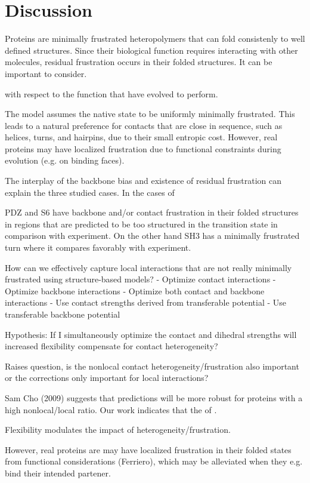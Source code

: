 \documentclass[preprint]{elsarticle}
\begin{document}
\section{Discussion}

    Proteins are minimally frustrated heteropolymers that can fold consistenly
to well defined structures. Since their biological function requires
interacting with other molecules, residual frustration occurs in their folded
structures. It can be important to consider.

 with respect to the function that have
evolved to perform.

    The model assumes the native state to be uniformly minimally frustrated.
This leads to a natural preference for contacts that are close in sequence,
such as helices, turns, and hairpins, due to their small entropic cost. 
However, real proteins may have localized frustration due to functional
constraints during evolution (e.g. on binding faces).  

    The interplay of the backbone bias and existence of residual frustration
can explain the three studied cases. In the cases of 

    PDZ and S6 have backbone and/or contact frustration in their folded
structures in regions that are predicted to be too structured in the transition
state in comparison with experiment. On the other hand SH3 has a minimally
frustrated turn where it compares favorably with experiment.

    How can we effectively capture local interactions that are not really
minimally frustrated using structure-based models?
    - Optimize contact interactions
    - Optimize backbone interactions
    - Optimize both contact and backbone interactions
    - Use contact strengths derived from transferable potential
    - Use transferable backbone potential

Hypothesis: If I simultaneously optimize the contact and dihedral strengths
will increased flexibility compensate for contact heterogeneity?

    Raises question, is the nonlocal contact heterogeneity/frustration also
important or the corrections only important for local interactions? 

    Sam Cho (2009) suggests that predictions will be more robust for 
proteins with a high nonlocal/local ratio. Our work indicates that the 
of .

    Flexibility modulates the impact of heterogeneity/frustration.


    However, real proteins are may have localized frustration in their folded
states from functional considerations (Ferriero), which may be alleviated when
they e.g. bind their intended partener. 
\end{document}
